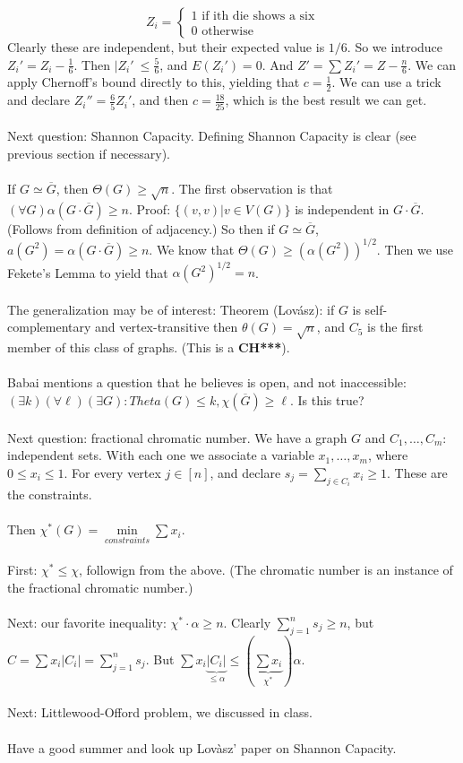 \documentclass[12pt]{article}
\theoremstyle{remark}
\begin{document}
\begin{section}
$$Z_i = \begin{cases}
1\text{ if ith die shows a six}\\
0\text{ otherwise}
\end{cases}$$
Clearly these are independent, but their expected value is $1/6$. So we introduce $Z_i' = Z_i - \frac 1 6$. Then $|Z_i'\ \leq \frac 5 6$, and $E(Z_i') = 0$. And $Z' = \sum Z_i' = Z- \frac n 6$. We can apply Chernoff's bound directly to this, yielding that $c = \frac 1 2$. We can use a trick and declare $Z_i'' = \frac 6 5 Z_i'$, and then $c = \frac{18}{25}$, which is the best result we can get.
\\\\
Next question: Shannon Capacity. Defining Shannon Capacity is clear (see previous section if necessary). 
\\\\
If $G \simeq \overline{G}$, then $\Theta(G) \geq \sqrt{n}$. The first observation is that $(\forall G) \alpha(G \cdot \overline{G}) \geq n$. Proof: $\{(v,v) | v \in V(G)\}$ is independent in $G \cdot \overline{G}$. (Follows from definition of adjacency.) So then if $G \simeq \overline{G}$, $a(G^2) = \alpha(G \cdot \overline{G}) \geq n$. We know that $\Theta(G) \geq (\alpha(G^2))^{1/2}$. Then we use Fekete's Lemma to yield that $\alpha(G^2)^{1/2} = n$.
\\\\
The generalization may be of interest: Theorem (Lov\'asz): if $G$ is self-complementary and vertex-transitive then $\theta(G) = \sqrt{n}$, and $C_5$ is the first member of this class of graphs. (This is a \textbf{CH***}).
\\\\
Babai mentions a question that he believes is open, and not inaccessible: $(\exists k)(\forall \ell)(\exists G): Theta(G) \leq k, \chi(\overline{G}) \geq \ell$. Is this true?
\\\\
Next question: fractional chromatic number. We have a graph $G$ and $C_1,\ldots,C_m$: independent sets. With each one we associate a variable $x_1,\ldots,x_m$, where $0 \leq x_i \leq 1$. For every vertex $j \in [n]$, and declare $s_j =\sum_{j \in C_i} x_i \geq 1$. These are the constraints.
\\\\
Then $\chi^*(G) = \min\limits_{constraints} \sum x_i$.
\\\\
First: $\chi^* \leq \chi$, followign from the above. (The chromatic number is an instance of the fractional chromatic number.)
\\\\
Next: our favorite inequality: $\chi^* \cdot \alpha \geq n$. Clearly $\sum_{j=1}^n s_j \geq n$, but $C = \sum x_i |C_i| = \sum_{j=1}^n s_j$. But $\sum x_i \underbrace{|C_i|}_{\leq \alpha} \leq \left(\underbrace{\sum x_i}_{\chi^*} \right)\alpha$.
\\\\
Next: Littlewood-Offord problem, we discussed in class.
\\\\
Have a good summer and look up Lov{\`a}sz' paper on Shannon Capacity.


\end{section}
\end{document}
